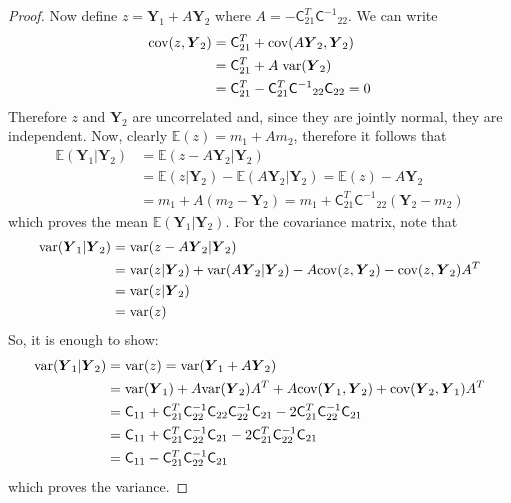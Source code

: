 \documentclass[twocolumn]{svjour3}          %
\newcommand{\bm}[1]{\boldsymbol{#1}}
\newcommand{\Ex}{\mathbb{E}}
\newcommand{\vY}{\bm{Y}}
\newcommand{\mC}{\mathsf{C}}
\newcommand{\mCInv}{{\mathsf{C}^{-1}}}
\newcommand{\cov}{{\textup{cov}}}
\newcommand{\var}{{\textup{var}}}
\begin{document}
\begin{proof}
Now define $z=\vY_1+ A \vY_2$ where $A=-\mC_{21}^T \mCInv_{22}$. We can write
\begin{align*}
\cov(z,\vY_2) &= \mC_{21}^T + \cov(A\vY_2,\vY_2)
\\
&=\mC_{21}^T + A \; \var(\vY_2)
\\
&=\mC_{21}^T-\mC_{21}^T\mCInv_{22}\mC_{22}=0
\end{align*}
Therefore $z$ and $\vY_2$ are uncorrelated and, since they are jointly normal, they are independent. Now, clearly $\Ex(z) = m_1 + A m_2$, therefore it follows that
\begin{align*}
\Ex(\vY_1 \vert \vY_2) &= \Ex(z - A \vY_2 \vert \vY_2) 
\\
& = \Ex(z \vert \vY_2) - \Ex(A \vY_2 \vert \vY_2) 
= \Ex(z)-A\vY_2 
\\
& = m_1 + A (m_2-\vY_2)=  m_1+ \mC_{21}^T \mCInv_{22}(\vY_2 - m_2)
\end{align*}
which proves the mean $\Ex(\vY_1 \vert \vY_2)$. For the covariance matrix, note that
\begin{align*}
\var(\vY_1|\vY_2) &=\var(z - A\vY_2|\vY_2)
\\
& =\var(z|\vY_2)+\var(A\vY_2|\vY_2) - A \cov(z, \vY_2) - \cov(z, \vY_2)A^T
\\
& =\var(z|\vY_2)
\\
&=\var(z)
\end{align*}
So, it is enough to show:
\begin{align*}
\var(\vY_1|\vY_2) & =\var(z) =\var(\vY_1+A\vY_2)
\\
 & =\var(\vY_1)+A\var(\vY_2)A^T + A \cov(\vY_1,\vY_2) + \cov(\vY_2,\vY_1)A^T
\\
&=\mC_{11}+\mC_{21}^T\mC_{22}^{-1}\mC_{22}\mC_{22}^{-1}\mC_{21}-2\mC_{21}^T\mC_{22}^{-1}\mC_{21}
\\
&=\mC_{11}+\mC_{21}^T\mC_{22}^{-1}\mC_{21}-2\mC_{21}^T\mC_{22}^{-1}\mC_{21}
\\
&=\mC_{11}-\mC_{21}^T\mC_{22}^{-1}\mC_{21}
\end{align*}
which proves the variance.


\end{proof}









\iffalse
\end{document}
